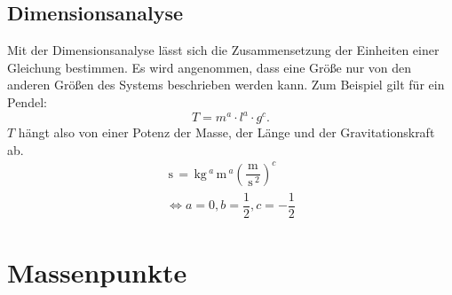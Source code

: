 \documentclass[a4paper,12pt]{article}
\numberwithin{equation}{section}
\begin{document}
\subsection{Dimensionsanalyse}
Mit der Dimensionsanalyse lässt sich die Zusammensetzung der Einheiten einer Gleichung bestimmen. Es wird angenommen, dass eine Größe nur von den anderen Größen des Systems beschrieben werden kann. Zum Beispiel gilt für ein Pendel:
\[ 
        T=m ^{a}\cdot l^{a}\cdot g^{c}
.\] 
$T$ hängt also von einer Potenz der Masse, der Länge und der Gravitationskraft ab.
\begin{gather*}
        \,\text{s}\,=\,\text{kg}\,^{a}\,\text{m}\, ^{a}\left(\dfrac{\,\text{m}\,}{\,\text{s}\, ^2}\right)^{c}\\
        \Leftrightarrow a=0,b=\dfrac{1}{2},c=-\dfrac{1}{2}
\end{gather*}

\section{Massenpunkte}
\end{document}
